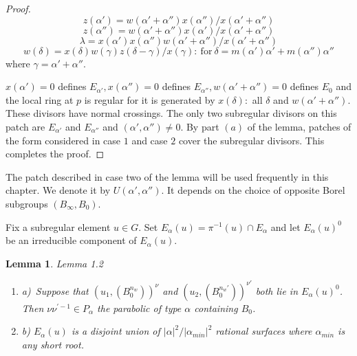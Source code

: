 \documentclass{memo-l}
\newtheorem{lemma}[theorem]{Lemma}
\theoremstyle{definition}
\theoremstyle{remark}
\numberwithin{section}{chapter}
\numberwithin{equation}{chapter}
\begin{document}
\begin{proof}
$$
z({\alpha}')  =  w({\alpha}'+{\alpha''})x({\alpha''})/x({\alpha}'+{\alpha''})
$$
$$
z({\alpha''})  =  w({\alpha}'+{\alpha''})x({\alpha}')/x({\alpha}'+{\alpha}'')
$$
$$
{\lambda}  = 
x({\alpha}')x({\alpha}'')w({\alpha}'+{\alpha}'')/x({\alpha}'+{\alpha}'')
$$
$$
w({\delta})  =  x({\delta})w({\gamma})z({\delta}-{\gamma})/x({\gamma}):\ 
{\text{for}}\ {\delta}  =  m({\alpha}'){\alpha}'+m({\alpha''}){\alpha''}
$$
where ${\gamma}  =  {\alpha}'+{\alpha''}$.



$x({\alpha}')  =  0$ defines $E_{{\alpha}'}, x({\alpha''})  =  0$ defines
$E_{{\alpha}''}, w({\alpha}'+{\alpha''})  =  0$ defines $E_{0}$ and the local ring
at $p$ is regular for it is generated by $x({\delta}) :$ all ${\delta}$ and
$w({\alpha}'+{\alpha''})$.  These divisors have normal crossings.  The only
two subregular divisors on this patch are $E_{{\alpha}'}$ and
$E_{{\alpha}''}$ and $({\alpha}',{\alpha''}) \ne 0$.  By part $(a)$ of the
lemma, patches of the form considered in case $1$ and case $2$ cover the
subregular divisors.  This completes the proof.
\end{proof} 
{\medskip}

   The patch described in case two of the lemma will be used frequently in
this chapter.  We denote it by $U({\alpha}',{\alpha''})$.  It depends on the
choice of opposite Borel subgroups $(B_{{\infty}},B_{0})$.

   Fix a subregular element $u \in G$.  Set $E_{{\alpha}}(u)  = 
{\pi}^{-1}(u) \cap E_{{\alpha}}$ and let $E_{{\alpha}}(u)^{0}$ be an
irreducible component of $E_{{\alpha}}(u)$.

\begin{lemma}{Lemma 1.2}
\begin{enumerate}
\item{a)}\ Suppose that $(u_{1},(B_{0}^{n_w}))^\nu$ and
$(u_{2},(B_{0}^{n_w'}))^{\nu'}$ both lie in
$E_{{\alpha}}(u)^{0}$.  Then ${\nu}{\nu}^{\prime-1} \in P_{{\alpha}}$ the
parabolic of type ${\alpha}$ containing $B_{0}$.
\item{b)} $E_{{\alpha}}(u)$ is a disjoint union of $\vert {\alpha}\vert ^{2}/\vert
{\alpha}_{min}\vert ^{2}$ rational surfaces where ${\alpha}_{min}$ is any
short root.
\end{enumerate}
\end{lemma}

\medpagebreak
\end{document}
